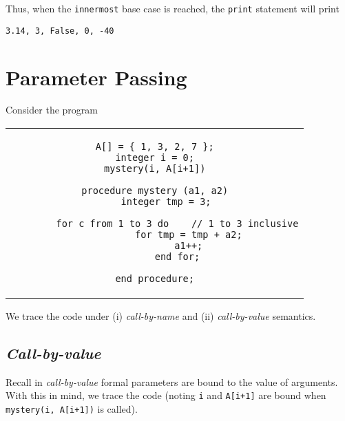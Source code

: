 \documentclass[paper=a4, fontsize=11pt]{scrartcl} %
\numberwithin{equation}{section} %
\numberwithin{figure}{section} %
\numberwithin{table}{section} %
\begin{document}
Thus, when the \texttt{innermost} base case is reached, the \texttt{print} statement will print
\begin{center}
\texttt{3.14, 3, False, 0, -40}
\end{center}


\section{Parameter Passing}

Consider the program 
\lstset{numbers=left,
  stepnumber=1,    
  firstnumber=1,
  numberfirstline=true}
  
\begin{tcolorbox}[colback=white,colframe=black,width=\dimexpr\textwidth]
\begin{center}
\begin{tabular}{c}
\begin{lstlisting}
A[] = { 1, 3, 2, 7 };
integer i = 0;
mystery(i, A[i+1])

procedure mystery (a1, a2)
	integer tmp = 3;
	
		for c from 1 to 3 do	// 1 to 3 inclusive
			for tmp = tmp + a2;
			a1++;
		end for;

end procedure;
\end{lstlisting}
\end{tabular}
\end{center}
\end{tcolorbox}


We trace the code under (i) \emph{call-by-name} and (ii) \emph{call-by-value} semantics.

\subsection{\emph{Call-by-value}}

Recall in \emph{call-by-value} formal parameters are bound to the value of arguments. With this in mind, we trace the code (noting \texttt{i} and \texttt{A[i+1]} are bound when \texttt{mystery(i, A[i+1])} is called).\\
\end{document}
